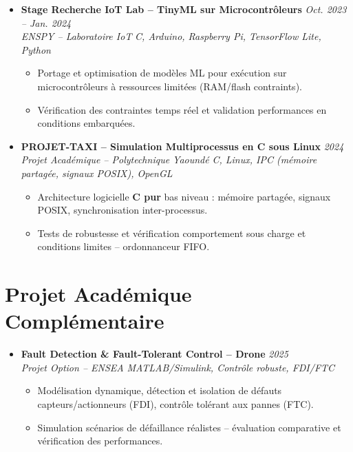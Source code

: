 \documentclass[a4paper,11pt]{article}
\begin{document}
\begin{itemize}[leftmargin=*, label={-}]
\item \textbf{Stage Recherche IoT Lab -- TinyML sur Microcontrôleurs} \hfill \textit{Oct. 2023 -- Jan. 2024} \\
\textit{ENSPY -- Laboratoire IoT} \hfill \textit{C, Arduino, Raspberry Pi, TensorFlow Lite, Python}
\vspace{-2pt}
    \begin{itemize}[leftmargin=0.4cm, nosep, label=\tiny$\bullet$]
        \item \small{Portage et optimisation de modèles ML pour exécution sur microcontrôleurs à ressources limitées (RAM/flash contraints).}
        \item \small{Vérification des contraintes temps réel et validation performances en conditions embarquées.}
    \end{itemize}
\vspace{3pt}

\item \textbf{PROJET-TAXI -- Simulation Multiprocessus en C sous Linux} \hfill \textit{2024} \\
\textit{Projet Académique -- Polytechnique Yaoundé} \hfill \textit{C, Linux, IPC (mémoire partagée, signaux POSIX), OpenGL}
\vspace{-2pt}
    \begin{itemize}[leftmargin=0.4cm, nosep, label=\tiny$\bullet$]
        \item \small{Architecture logicielle \textbf{C pur} bas niveau : mémoire partagée, signaux POSIX, synchronisation inter-processus.}
        \item \small{Tests de robustesse et vérification comportement sous charge et conditions limites -- ordonnanceur FIFO.}
    \end{itemize}

\end{itemize}

\section{Projet Académique Complémentaire}
\begin{itemize}[leftmargin=*, label={-}]

\item \textbf{Fault Detection \& Fault-Tolerant Control -- Drone} \hfill \textit{2025} \\
\textit{Projet Option -- ENSEA} \hfill \textit{MATLAB/Simulink, Contrôle robuste, FDI/FTC}
\vspace{-2pt}
    \begin{itemize}[leftmargin=0.4cm, nosep, label=\tiny$\bullet$]
        \item \small{Modélisation dynamique, détection et isolation de défauts capteurs/actionneurs (FDI), contrôle tolérant aux pannes (FTC).}
        \item \small{Simulation scénarios de défaillance réalistes -- évaluation comparative et vérification des performances.}
    \end{itemize}

\end{itemize}
\end{document}
